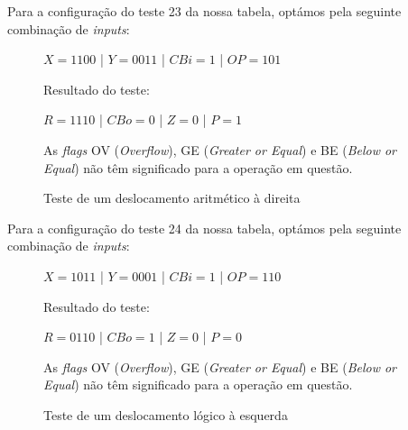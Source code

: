 Para a configuração do teste 23 da nossa tabela, optámos pela seguinte combinação de \textit{inputs}:
\begin{figure}[h]
    \centering
    \begin{tcolorbox}[halign=flush center,halign lower=flush center,text fill]
        \large $X = 1100$ | $Y = 0011$ | $CBi = 1$ | $OP = 101$
        
        \tcblower
        \large
        Resultado do teste:
        \vspace{2mm}
        
        $R = 1110$ | $CBo = 0$ | $Z = 0$ | $P = 1$
    \end{tcolorbox}
    \begin{marker}
        As \textit{flags} OV (\textit{Overflow}), GE (\textit{Greater or Equal}) e BE (\textit{Below or Equal}) não têm significado para a operação em questão.
    \end{marker}
    \caption{Teste de um deslocamento aritmético à direita}
\end{figure}


Para a configuração do teste 24 da nossa tabela, optámos pela seguinte combinação de \textit{inputs}:
\begin{figure}[h]
    \centering
    \begin{tcolorbox}[halign=flush center,halign lower=flush center,text fill]
        \large $X = 1011$ | $Y = 0001$ | $CBi = 1$ | $OP = 110$
        
        \tcblower
        \large
        Resultado do teste:
        \vspace{2mm}
        
        $R = 0110$ | $CBo = 1$ | $Z = 0$ | $P = 0$
    \end{tcolorbox}
        \begin{marker}
        As \textit{flags} OV (\textit{Overflow}), GE (\textit{Greater or Equal}) e BE (\textit{Below or Equal}) não têm significado para a operação em questão.
    \end{marker}
    \caption{Teste de um deslocamento lógico à esquerda}
\end{figure}

\newpage



